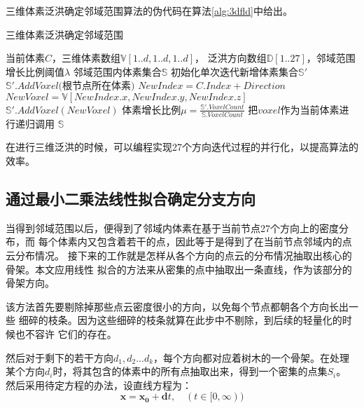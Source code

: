 三维体素泛洪确定邻域范围算法的伪代码在算法\ref{alg:3dfld}中给出。
\begin{algorithm}[H] 
	\caption{三维体素泛洪确定邻域范围}
	\label{alg:3dfld}
	\begin{algorithmic}[1]
		\Require 当前体素$C$，三维体素数组$\mathbb{V}[1..d,1..d,1..d]$，
		泛洪方向数组$\mathbb{D}[1..27]$，邻域范围增长比例阈值$\lambda$
		\Ensure	邻域范围内体素集合$\mathbb{S}$
		\State 初始化单次迭代新增体素集合$\mathbb{S'}$
		\State $\mathbb{S'}.AddVoxel($根节点所在体素$)$
			\State $NewIndex = C.Index + Direction$
			\State $NewVoxel = \mathbb{V}[NewIndex.x,NewIndex.y,NewIndex.z]$
				\State $\mathbb{S'}.AddVoxel(NewVoxel)$
			\EndIf
		\EndFor
		\State 体素增长比例$\mu=\frac{\mathbb{S'}.VoxelCount}{\mathbb{S}.VoxelCount}$
		\If{$\mu > \lambda$}
				\State 把$voxel$作为当前体素进行递归调用
			\EndFor
		\EndIf
		\State \Return $\mathbb{S}$
	\end{algorithmic}
\end{algorithm}

在进行三维泛洪的时候，可以编程实现27个方向迭代过程的并行化，以提高算法的效率。

\subsection{通过最小二乘法线性拟合确定分支方向}
\label{subsec:leastsquares}
当得到邻域范围以后，便得到了邻域内体素在基于当前节点27个方向上的密度分布，而
每个体素内又包含着若干的点，因此等于是得到了在当前节点邻域内的点云分布情况。
接下来的工作就是怎样从各个方向的点云的分布情况抽取出核心的骨架。本文应用线性
拟合的方法来从密集的点中抽取出一条直线，作为该部分的骨架方向。

该方法首先要剔除掉那些点云密度很小的方向，以免每个节点都朝各个方向长出一些
细碎的枝条。因为这些细碎的枝条就算在此步中不剔除，到后续的轻量化的时候也不容许
它们的存在。

然后对于剩下的若干方向$d_1,d_2...d_k$，每个方向都对应着树木的一个骨架。在处理
某个方向$d_i$时，将其包含的体素中的所有点抽取出来，得到一个密集的点集$S_i$。
然后采用待定方程的办法，设直线方程为：
\begin{equation}
	\mathbf{x} = \mathbf{x_0} + \mathbf{d}t,\quad(t \in [0,\infty))
\end{equation}

